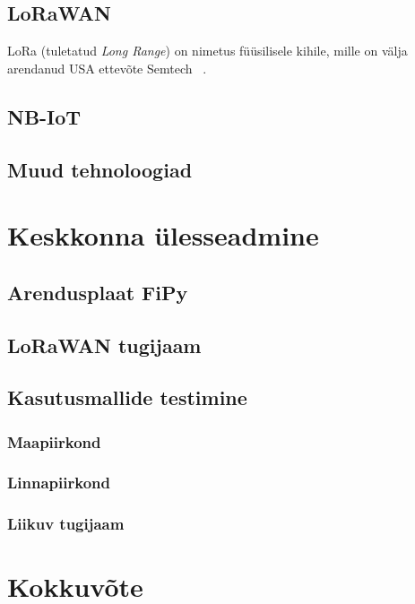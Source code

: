 \documentclass[12pt]{article}
\begin{document}
\subsection{LoRaWAN}

LoRa (tuletatud \textit{Long Range}) on nimetus füüsilisele kihile, mille on välja arendanud USA ettevõte Semtech ~\cite{loraIntro}.


\subsection{NB-IoT}

\subsection{Muud tehnoloogiad}

\newpage
\section{Keskkonna ülesseadmine}

\subsection{Arendusplaat FiPy}

\subsection{LoRaWAN tugijaam}

\subsection{Kasutusmallide testimine}

\subsubsection{Maapiirkond}

\subsubsection{Linnapiirkond}

\subsubsection{Liikuv tugijaam}

\newpage
\section{Kokkuvõte}
\end{document}
